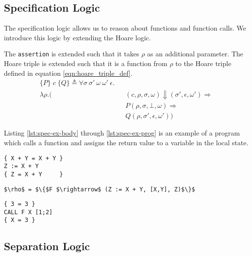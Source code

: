 \subsection{Specification Logic}
The specification logic allows us to reason about functions and function calls. We introduce this logic by extending the Hoare logic.

The \verb|assertion| is extended such that it takes $\rho$ as an additional parameter. The Hoare triple is extended such that it is a function from $\rho$ to the Hoare triple defined in equation \ref{eqn:hoare_triple_def}.
\begin{equation}
\begin{alignedat}{2}
\{P\}\;c\;\{Q\} \triangleq \forall \sigma \: \sigma' \: \omega \: \omega' \: \epsilon .\\
 \lambda\rho.(
  && (c,\rho,\sigma,\omega) \Downarrow (\sigma', \epsilon, \omega') \Rightarrow\\
&& P(\rho,\sigma,\bot,\omega) \Rightarrow\\
&& Q(\rho,\sigma',\epsilon,\omega'))
\end{alignedat}
\end{equation}

Listing \ref{lst:spec-ex-body} through \ref{lst:spec-ex-prog} is an example of a program which calls a function and assigns the return value to a variable in the local state.

\begin{lstlisting}[mathescape=true,keepspaces=true,label=lst:spec-ex-body,caption=The body of the function F]
{ X + Y = X + Y }
Z := X + Y
{ Z = X + Y     }
\end{lstlisting}

\begin{lstlisting}[mathescape=true,keepspaces=true,label=lst:spec-ex-env,caption=A partial function space containing the function F.]
$\rho$ = $\{$F $\rightarrow$ (Z := X + Y, [X,Y], Z)$\}$
\end{lstlisting}

\begin{lstlisting}[mathescape=true,keepspaces=true,label=lst:spec-ex-prog,caption=A program which call the function F and stores the result in X]
{ 3 = 3 }
CALL F X [1;2]
{ X = 3 }
\end{lstlisting}

\subsection{Separation Logic}

